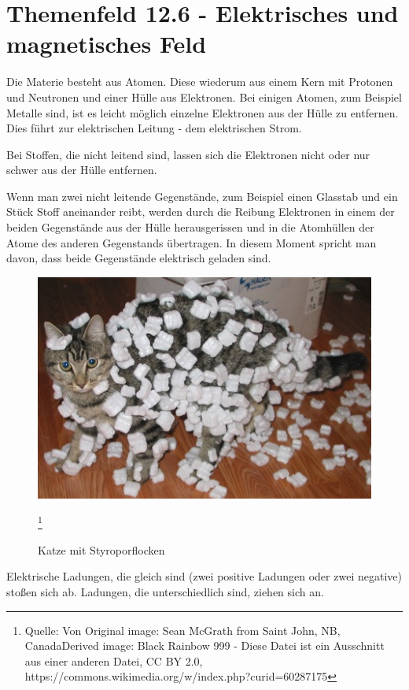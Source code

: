 \documentclass[aspectratio=169, ignorenonframetext]{beamer}
\begin{document}
\part{Themenfeld 12.6 - Elektrisches und magnetisches Feld}
Die Materie besteht aus Atomen. Diese wiederum aus einem Kern mit Protonen und Neutronen und einer Hülle aus Elektronen. Bei einigen Atomen, zum Beispiel Metalle sind, ist es leicht möglich einzelne Elektronen aus der Hülle zu entfernen. Dies führt zur elektrischen Leitung - dem elektrischen Strom.

Bei Stoffen, die nicht leitend sind, lassen sich die Elektronen nicht oder nur schwer aus der Hülle entfernen.

Wenn man zwei nicht leitende Gegenstände, zum Beispiel einen Glasstab und ein Stück Stoff aneinander reibt, werden durch die Reibung Elektronen in einem der beiden Gegenstände aus der Hülle herausgerissen und in die Atomhüllen der Atome des anderen Gegenstands übertragen. In diesem Moment spricht man davon, dass beide Gegenstände elektrisch geladen sind.

\begin{figure}[htb]
 \includegraphics{Cat_demonstrating_static_cling_with_styrofoam_peanuts.jpeg}
 \caption{Katze mit Styroporflocken}
 \label{abb:CatWidthStyropor}
 \footnote{Quelle: Von Original image: Sean McGrath from Saint John, NB, CanadaDerived image: Black Rainbow 999 - Diese Datei ist ein Ausschnitt aus einer anderen Datei, CC BY 2.0, https://commons.wikimedia.org/w/index.php?curid=60287175}
\end{figure}

Elektrische Ladungen, die gleich sind (zwei positive Ladungen oder zwei negative) stoßen sich ab. Ladungen, die unterschiedlich sind, ziehen sich an.
\end{document}
